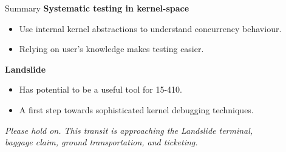 \documentclass[xcolor=dvipsnames]{beamer}
\begin{document}
\begin{frame}{Summary}
	\textbf{Systematic testing in kernel-space}
	\begin{itemize}
		\item Use internal kernel abstractions to understand concurrency behaviour.
		\item Relying on user's knowledge makes testing easier.
	\end{itemize}
	\linegap
	\textbf{Landslide}
	\begin{itemize}
		\item Has potential to be a useful tool for 15-410.
		\item A first step towards sophisticated kernel debugging techniques.
	\end{itemize}

	\linegap
	\linegap
	\begin{center}
	{\scriptsize \em Please hold on. This transit is approaching the Landslide terminal, \\baggage claim, ground transportation, and ticketing.}
	\end{center}
\end{frame}

\end{document}
